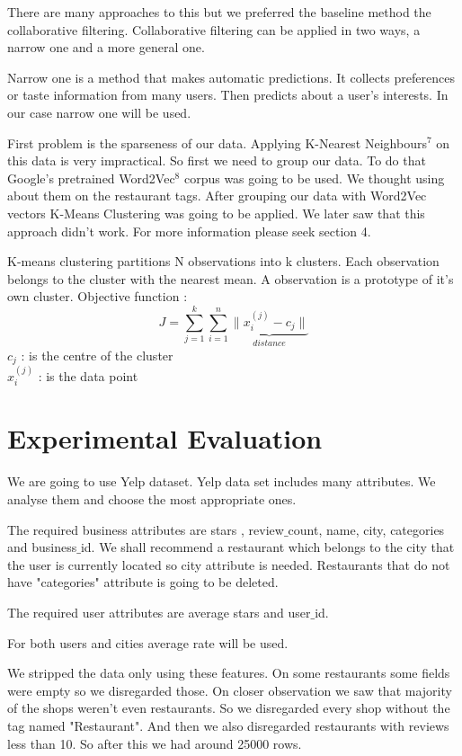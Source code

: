 \documentclass{article} %
\begin{document}
There are many approaches to this but we preferred the baseline method the collaborative filtering. Collaborative filtering can be applied in two ways, a narrow one and a more general one. 


Narrow one is a method that makes automatic predictions. It collects preferences or taste information from many users. Then predicts about a user's interests. In our case narrow one will be used.



First problem is the sparseness of our data. Applying K-Nearest Neighbours$^7$ on this data is very impractical. So first we need to group our data. To do that Google's pretrained Word2Vec$^8$ corpus was going to be used. We thought using about them on the restaurant tags. After grouping our data with Word2Vec vectors K-Means Clustering was going to be applied. We later saw that this approach didn't work. For more information please seek section 4.


K-means clustering partitions N observations into k clusters. Each observation belongs to the cluster with the nearest mean. A observation is a prototype of it's own cluster. Objective function :
$$ J = \sum^{k}_{j=1}\sum^{n}_{i=1}\underbrace{\|x_{i}^{(j)}-c_{j}\|}_{distance}$$
$c_{j}$ : is the centre of the cluster\\
$x_{i}^{(j)}$ : is the data point\\

\section{Experimental Evaluation}

We are going to use Yelp dataset. Yelp data set includes many attributes. We analyse them and choose the most appropriate ones. 

The required business attributes are stars , review$\_$count, name, city, categories and business$\_$id. We shall recommend a restaurant  which belongs to the city that the user is currently located so city attribute is needed. Restaurants that do not have "categories" attribute is going to be deleted.

The required user attributes are average stars and user$\_$id.

For both users and cities average rate will be used.

We stripped the data only using these features. On some restaurants some fields were empty so we disregarded those. On closer observation we saw that majority of the shops weren't even restaurants. So we disregarded every shop without the tag named "Restaurant". And then we also disregarded restaurants with reviews less than 10. So after this we had around 25000 rows. \\
\end{document}

